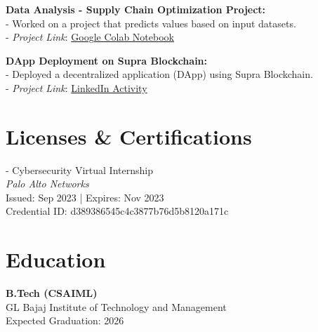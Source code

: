 \documentclass[10pt,a4paper]{article}
\begin{document}
\vspace{0.5cm}

\textbf{Data Analysis - Supply Chain Optimization Project:} \\
- Worked on a project that predicts values based on input datasets. \\
- \textit{Project Link}: \href{https://colab.research.google.com/drive/1oerymer59yNBsci5yjF93uwXIjKb9nNo}{Google Colab Notebook}

\vspace{0.5cm}

\textbf{DApp Deployment on Supra Blockchain:} \\
- Deployed a decentralized application (DApp) using Supra Blockchain. \\
- \textit{Project Link}: \href{https://www.linkedin.com/posts/hrs097_blockchain-supratestnet-smartcontracts-activity-7281205531988402176-VxCw?utm_source=share&utm_medium=member_desktop}{LinkedIn Activity}

\vspace{1cm}

\section*{Licenses \& Certifications}
- Cybersecurity Virtual Internship \\
  \textit{Palo Alto Networks} \\
  Issued: Sep 2023 | Expires: Nov 2023 \\
  Credential ID: d389386545c4c3877b76d5b8120a171c

\vspace{1cm}

\section*{Education}
\textbf{B.Tech (CSAIML)} \\
GL Bajaj Institute of Technology and Management \\
Expected Graduation: 2026
\end{document}

